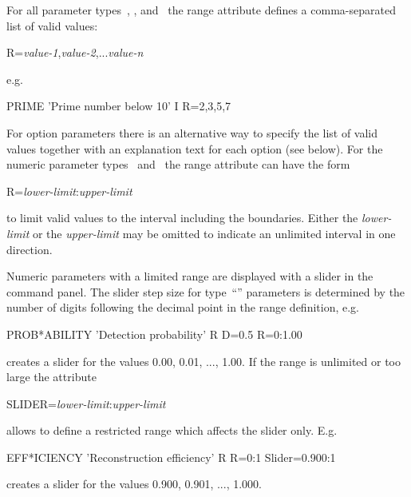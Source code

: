 For all parameter types~, , and~ the range
attribute defines a comma-separated list of valid values:
\begin{XMP} 
R=\textsl{value-1},\textsl{value-2},...\textsl{value-n}
\end{XMP}
e.g.\
\begin{XMP} 
PRIME \quad 'Prime number below 10' \quad I \quad R=2,3,5,7
\end{XMP}
For option parameters there is an alternative way to specify the list
of valid values together with an explanation text for each option (see below).
For the numeric parameter types~\Lit{I} and~\Lit{R} the range
attribute can have the form
\begin{XMP} 
R=\textsl{lower-limit}:\textsl{upper-limit}
\end{XMP}
to limit valid values to the interval including the boundaries.
Either the \textsl{lower-limit} or the \textsl{upper-limit} may be
omitted to indicate an unlimited interval in one direction.

Numeric parameters with a limited range are displayed with a slider in
the \Motif{} command panel.
The slider step size for type~``'' parameters is determined by
the number of digits following the decimal point in the range
definition, e.g.\
\begin{XMP} 
PROB*ABILITY  'Detection probability'  R  D=0.5  R=0:1.00
\end{XMP}
creates a slider for the values 0.00, 0.01, ..., 1.00.
If the range is unlimited or too large the  attribute
\begin{XMP} 
SLIDER=\textsl{lower-limit}:\textsl{upper-limit}
\end{XMP}
allows to define a restricted range which affects the slider only.
E.g.\
\begin{XMP} 
EFF*ICIENCY  'Reconstruction efficiency'  R  R=0:1  Slider=0.900:1
\end{XMP}
creates a slider for the values 0.900, 0.901, ..., 1.000.

\begin{figure}[tb]
\end{figure}

\begin{figure}[tb]
\end{figure}


